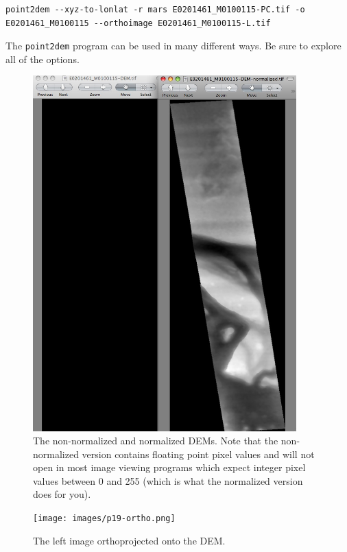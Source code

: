 \begin{verbatim}
point2dem --xyz-to-lonlat -r mars E0201461_M0100115-PC.tif -o E0201461_M0100115 --orthoimage E0201461_M0100115-L.tif 
\end{verbatim}

The \texttt{point2dem} program can be used in many different ways.
Be sure to explore all of the options.

\begin{figure}
\begin{center}
\includegraphics[width=4in]{images/p19-dems.png}
\caption[P19 dem images]{
    \label{p19-dems}
	The non-normalized and normalized DEMs. Note that the
	non-normalized version contains floating point pixel values
	and will not open in most image viewing programs which
	expect integer pixel values between 0 and 255 (which is
	what the normalized version does for you).
    }
\end{center}
\end{figure}

\begin{figure}
\begin{center}
\texttt{[image: images/p19-ortho.png]}
\caption[P19 orthophoto]{
    \label{p19-ortho}
	The left image orthoprojected onto the DEM.
    }
\end{center}
\end{figure}

